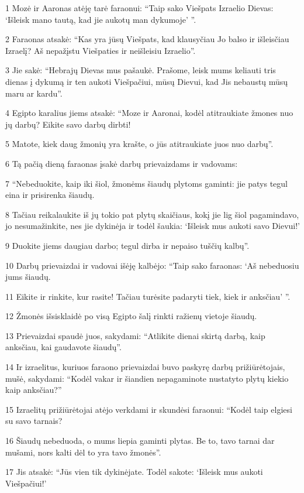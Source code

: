 \par 1 Mozė ir Aaronas atėję tarė faraonui: “Taip sako Viešpats Izraelio Dievas: ‘Išleisk mano tautą, kad jie aukotų man dykumoje’ ”. 
\par 2 Faraonas atsakė: “Kas yra jūsų Viešpats, kad klausyčiau Jo balso ir išleisčiau Izraelį? Aš nepažįstu Viešpaties ir neišleisiu Izraelio”. 
\par 3 Jie sakė: “Hebrajų Dievas mus pašaukė. Prašome, leisk mums keliauti tris dienas į dykumą ir ten aukoti Viešpačiui, mūsų Dievui, kad Jis nebaustų mūsų maru ar kardu”. 
\par 4 Egipto karalius jiems atsakė: “Moze ir Aaronai, kodėl atitraukiate žmones nuo jų darbų? Eikite savo darbų dirbti! 
\par 5 Matote, kiek daug žmonių yra krašte, o jūs atitraukiate juos nuo darbų”. 
\par 6 Tą pačią dieną faraonas įsakė darbų prievaizdams ir vadovams: 
\par 7 “Nebeduokite, kaip iki šiol, žmonėms šiaudų plytoms gaminti: jie patys tegul eina ir prisirenka šiaudų. 
\par 8 Tačiau reikalaukite iš jų tokio pat plytų skaičiaus, kokį jie lig šiol pagamindavo, jo nesumažinkite, nes jie dykinėja ir todėl šaukia: ‘Išleisk mus aukoti savo Dievui!’ 
\par 9 Duokite jiems daugiau darbo; tegul dirba ir nepaiso tuščių kalbų”. 
\par 10 Darbų prievaizdai ir vadovai išėję kalbėjo: “Taip sako faraonas: ‘Aš nebeduosiu jums šiaudų. 
\par 11 Eikite ir rinkite, kur rasite! Tačiau turėsite padaryti tiek, kiek ir anksčiau’ ”. 
\par 12 Žmonės išsisklaidė po visą Egipto šalį rinkti ražienų vietoje šiaudų. 
\par 13 Prievaizdai spaudė juos, sakydami: “Atlikite dienai skirtą darbą, kaip anksčiau, kai gaudavote šiaudų”. 
\par 14 Ir izraelitus, kuriuos faraono prievaizdai buvo paskyrę darbų prižiūrėtojais, mušė, sakydami: “Kodėl vakar ir šiandien nepagaminote nustatyto plytų kiekio kaip anksčiau?” 
\par 15 Izraelitų prižiūrėtojai atėjo verkdami ir skundėsi faraonui: “Kodėl taip elgiesi su savo tarnais? 
\par 16 Šiaudų nebeduoda, o mums liepia gaminti plytas. Be to, tavo tarnai dar mušami, nors kalti dėl to yra tavo žmonės”. 
\par 17 Jis atsakė: “Jūs vien tik dykinėjate. Todėl sakote: ‘Išleisk mus aukoti Viešpačiui!’ 
